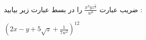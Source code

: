 \p
ضریب عبارت
$\frac{x^3 y z^{\frac{5}{2}}}{w^6}$
را در بسط عبارت زیر بیابید :
\begin{center}
  $(2x - y + 5\sqrt{z} + \frac{1}{7w^2})^{12}$
\end{center}